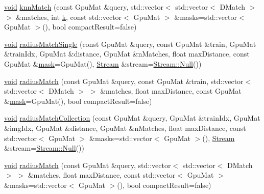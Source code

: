 \begin{DoxyCompactItemize}
\item 
\hyperlink{legacy_8hpp_a8bb47f092d473522721002c86c13b94e}{void} \hyperlink{classcv_1_1gpu_1_1BruteForceMatcher__GPU__base_a4283326677c0f0c28dc97896cac75022}{knn\-Match} (const Gpu\-Mat \&query, std\-::vector$<$ std\-::vector$<$ D\-Match $>$ $>$ \&matches, int \hyperlink{legacy_8hpp_a7be9b6436e5ea72ff5d5a66779b4bd38}{k}, const std\-::vector$<$ Gpu\-Mat $>$ \&masks=std\-::vector$<$ Gpu\-Mat $>$(), bool compact\-Result=false)
\item 
\hyperlink{legacy_8hpp_a8bb47f092d473522721002c86c13b94e}{void} \hyperlink{classcv_1_1gpu_1_1BruteForceMatcher__GPU__base_a65941a980da13a3a2e3d63feb45269f0}{radius\-Match\-Single} (const Gpu\-Mat \&query, const Gpu\-Mat \&train, Gpu\-Mat \&train\-Idx, Gpu\-Mat \&distance, Gpu\-Mat \&n\-Matches, float max\-Distance, const Gpu\-Mat \&\hyperlink{tracking_8hpp_a6b13ecd2fd6ec7ad422f1d7863c3ad19}{mask}=Gpu\-Mat(), \hyperlink{classcv_1_1gpu_1_1Stream}{Stream} \&stream=\hyperlink{classcv_1_1gpu_1_1Stream_af96c23564834f88333dcb8997df553f1}{Stream\-::\-Null}())
\item 
\hyperlink{legacy_8hpp_a8bb47f092d473522721002c86c13b94e}{void} \hyperlink{classcv_1_1gpu_1_1BruteForceMatcher__GPU__base_a2d00aa7938bc2828fb95232824da3a2a}{radius\-Match} (const Gpu\-Mat \&query, const Gpu\-Mat \&train, std\-::vector$<$ std\-::vector$<$ D\-Match $>$ $>$ \&matches, float max\-Distance, const Gpu\-Mat \&\hyperlink{tracking_8hpp_a6b13ecd2fd6ec7ad422f1d7863c3ad19}{mask}=Gpu\-Mat(), bool compact\-Result=false)
\item 
\hyperlink{legacy_8hpp_a8bb47f092d473522721002c86c13b94e}{void} \hyperlink{classcv_1_1gpu_1_1BruteForceMatcher__GPU__base_a6f0eaaf02db76c4f76007cc0fa0f7c47}{radius\-Match\-Collection} (const Gpu\-Mat \&query, Gpu\-Mat \&train\-Idx, Gpu\-Mat \&img\-Idx, Gpu\-Mat \&distance, Gpu\-Mat \&n\-Matches, float max\-Distance, const std\-::vector$<$ Gpu\-Mat $>$ \&masks=std\-::vector$<$ Gpu\-Mat $>$(), \hyperlink{classcv_1_1gpu_1_1Stream}{Stream} \&stream=\hyperlink{classcv_1_1gpu_1_1Stream_af96c23564834f88333dcb8997df553f1}{Stream\-::\-Null}())
\item 
\hyperlink{legacy_8hpp_a8bb47f092d473522721002c86c13b94e}{void} \hyperlink{classcv_1_1gpu_1_1BruteForceMatcher__GPU__base_a51717fe5cf552db4fb6310a072779be0}{radius\-Match} (const Gpu\-Mat \&query, std\-::vector$<$ std\-::vector$<$ D\-Match $>$ $>$ \&matches, float max\-Distance, const std\-::vector$<$ Gpu\-Mat $>$ \&masks=std\-::vector$<$ Gpu\-Mat $>$(), bool compact\-Result=false)
\end{DoxyCompactItemize}
